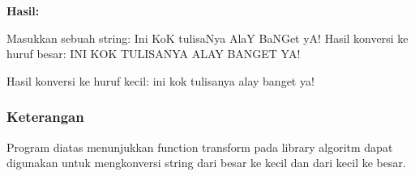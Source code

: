 \textbf{Hasil:}

\begin{lcverbatim}
Masukkan sebuah string:
Ini KoK tulisaNya AlaY BaNGet yA!
Hasil konversi ke huruf besar:
INI KOK TULISANYA ALAY BANGET YA!

Hasil konversi ke huruf kecil:
ini kok tulisanya alay banget ya!
\end{lcverbatim}

\subsubsection*{Keterangan}

Program diatas menunjukkan function transform pada library algoritm
dapat digunakan untuk mengkonversi string dari besar ke kecil dan dari
kecil ke besar.
